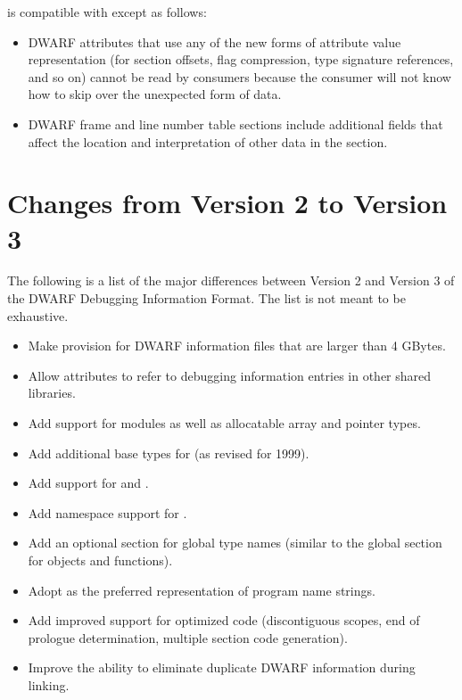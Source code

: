  is compatible with
 except as follows:
\begin{itemize}
\item DWARF attributes that use any of the new forms of attribute value representation (for
section offsets, flag compression, type signature references, and so on) cannot be read by
consumers because the consumer will not know how to skip over the
unexpected form of data.
\item DWARF frame and line number table sections include additional fields that affect the location
and interpretation of other data in the section.
\end{itemize}

\section{Changes from Version 2 to Version 3}
The following is a list of the major differences between
Version 2 and Version 3 of the DWARF Debugging Information
Format. The list is not meant to be exhaustive.
\begin{itemize}
\item
Make provision for DWARF information files that are larger
than 4 GBytes.
\item
Allow attributes to refer to debugging information entries
in other shared libraries.
\item
Add support for  modules as well as allocatable
array and pointer types.
\item
Add additional base types for  (as revised for 1999).
\item
Add support for  and .
\item
Add namespace support for .
\item
Add an optional section for global type names (similar to
the global section for objects and functions).
\item
Adopt  as the preferred representation of program name strings.
\item
Add improved support for optimized code (discontiguous
scopes, end of prologue determination, multiple section
code generation).
\item Improve the ability to eliminate
duplicate DWARF information during linking.
\end{itemize}

